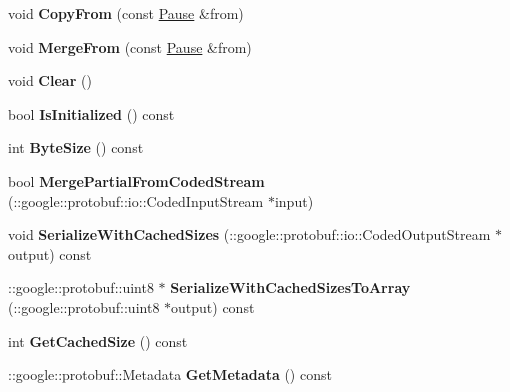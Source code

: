 \begin{DoxyCompactItemize}
\item 
\hypertarget{class_pause_a8a4f7ea801fa755ad33ec4c503e8c36e}{void {\bfseries Copy\-From} (const \hyperlink{class_pause}{Pause} \&from)}\label{class_pause_a8a4f7ea801fa755ad33ec4c503e8c36e}

\item 
\hypertarget{class_pause_a0363eac7eeaeb5bee0d8be630581aa94}{void {\bfseries Merge\-From} (const \hyperlink{class_pause}{Pause} \&from)}\label{class_pause_a0363eac7eeaeb5bee0d8be630581aa94}

\item 
\hypertarget{class_pause_a17c998beccec414a6293b7e83281b3a2}{void {\bfseries Clear} ()}\label{class_pause_a17c998beccec414a6293b7e83281b3a2}

\item 
\hypertarget{class_pause_a5ac3603904cbb13f443e4a79386f3247}{bool {\bfseries Is\-Initialized} () const }\label{class_pause_a5ac3603904cbb13f443e4a79386f3247}

\item 
\hypertarget{class_pause_a4ad86c01ac23daac3e82658eca137666}{int {\bfseries Byte\-Size} () const }\label{class_pause_a4ad86c01ac23daac3e82658eca137666}

\item 
\hypertarget{class_pause_abc751f0e64bdb9043bf3a1b56c5c89f4}{bool {\bfseries Merge\-Partial\-From\-Coded\-Stream} (\-::google\-::protobuf\-::io\-::\-Coded\-Input\-Stream $\ast$input)}\label{class_pause_abc751f0e64bdb9043bf3a1b56c5c89f4}

\item 
\hypertarget{class_pause_a2fb568f1850b6cdd8eaa699cab95b56e}{void {\bfseries Serialize\-With\-Cached\-Sizes} (\-::google\-::protobuf\-::io\-::\-Coded\-Output\-Stream $\ast$output) const }\label{class_pause_a2fb568f1850b6cdd8eaa699cab95b56e}

\item 
\hypertarget{class_pause_a3b78bd2c68b91fff5589432206b5b7d1}{\-::google\-::protobuf\-::uint8 $\ast$ {\bfseries Serialize\-With\-Cached\-Sizes\-To\-Array} (\-::google\-::protobuf\-::uint8 $\ast$output) const }\label{class_pause_a3b78bd2c68b91fff5589432206b5b7d1}

\item 
\hypertarget{class_pause_a2af36b0dec18ac3b93b02208cf2c66d3}{int {\bfseries Get\-Cached\-Size} () const }\label{class_pause_a2af36b0dec18ac3b93b02208cf2c66d3}

\item 
\hypertarget{class_pause_af38c3c10a11ca18dd476c8b076a03c80}{\-::google\-::protobuf\-::\-Metadata {\bfseries Get\-Metadata} () const }\label{class_pause_af38c3c10a11ca18dd476c8b076a03c80}


\end{DoxyCompactItemize}
